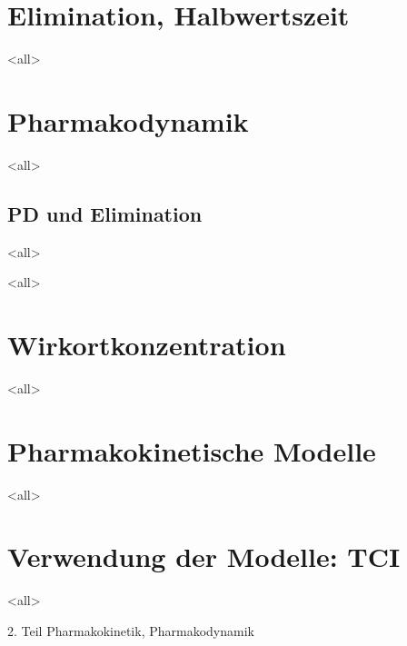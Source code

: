 \mode*
\section{Elimination, Halbwertszeit}
\mode<all>


\section{Pharmakodynamik}
\mode<all>


\subsection{PD und Elimination}
\mode<all>




\mode<all>
\section{Wirkortkonzentration}
\mode<all>


\section{Pharmakokinetische Modelle}
\mode<all>


\section{Verwendung der Modelle: TCI}
\mode<all>



{\huge{2. Teil Pharmakokinetik, Pharmakodynamik}}

